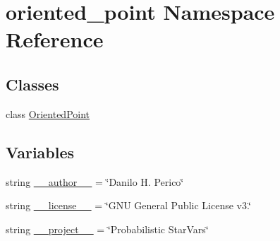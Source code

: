 \hypertarget{namespaceoriented__point}{\section{oriented\-\_\-point Namespace Reference}
\label{namespaceoriented__point}
}
\subsection*{Classes}
\begin{DoxyCompactItemize}
\item 
class \hyperlink{classoriented__point_1_1OrientedPoint}{Oriented\-Point}
\end{DoxyCompactItemize}
\subsection*{Variables}
\begin{DoxyCompactItemize}
\item 
string \hyperlink{namespaceoriented__point_aa3b4d2d674d85c3cbe62dd838254d6d0}{\-\_\-\-\_\-author\-\_\-\-\_\-} = \char`\"{}Danilo H. Perico\char`\"{}
\item 
string \hyperlink{namespaceoriented__point_a3d6cc46d63eaa6bbf92eff2835e6a1c2}{\-\_\-\-\_\-license\-\_\-\-\_\-} = \char`\"{}G\-N\-U General Public License v3.\char`\"{}
\item 
string \hyperlink{namespaceoriented__point_a9691eace975baee6e55c7185dc3bb251}{\-\_\-\-\_\-project\-\_\-\-\_\-} = \char`\"{}Probabilistic Star\-Vars\char`\"{}
\end{DoxyCompactItemize}


